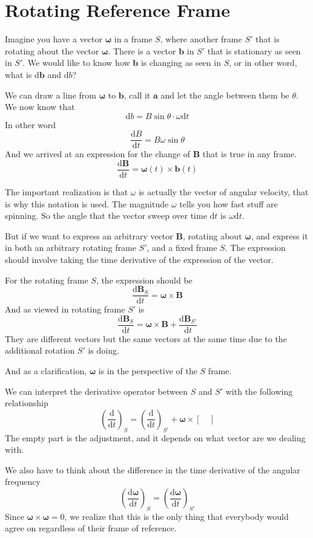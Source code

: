 \documentclass[12pt]{article}
\newcommand{\dydx}[2]{\frac{\text{d} #1}{\text{d} #2}}
\newcommand{\sqbkt}[1]{\left[ #1 \right]}
\newcommand{\paren}[1]{\left( #1 \right)}
\begin{document}
\section{Rotating Reference Frame}

Imagine you have a vector $\boldsymbol\omega$ in a frame $S$, where another frame $S'$ that is rotating about the vector $\boldsymbol{\omega}$. There is a vector $\mathbf{b}$ in $S'$ that is stationary as seen in $S'$. We would like to know how $\mathbf{b}$ is changing as seen in $S$, or in other word, what is $\text{d}\mathbf{b}$ and $\text{d}b$?

We can draw a line from $\boldsymbol\omega$ to $\mathbf{b}$, call it $\mathbf{a}$ and let the angle between them be $\theta$. We now know that
\[
\text{d}b = B\sin\theta\cdot \omega \text{d}t
\]
In other word
\[
\dydx{B}{t} = B\omega\sin\theta
\]
And we arrived at an expression for the change of $\mathbf{B}$ that is true in any frame.
\[
\dydx{\mathbf{B}}{t} = \boldsymbol{\omega}(t)\times \mathbf{b}(t)
\]

The important realization is that $\omega$ is actually the vector of angular velocity, that is why this notation is used. The magnitude $\omega$ tells you how fast stuff are spinning. So the angle that the vector sweep over time $\text{d}t$ is $\omega\text{d}t$.

But if we want to express an arbitrary vector $\mathbf{B}$, rotating about $\boldsymbol{\omega}$, and express it in both an arbitrary rotating frame $S'$, and a fixed frame $S$. The expression should involve taking the time derivative of the expression of the vector.

For the rotating frame $S$, the expression should be
\[
\dydx{\mathbf{B}_{S}}{t} = \boldsymbol{\omega} \times \mathbf{B}
\]
And as viewed in rotating frame $S'$ is
\[
\dydx{\mathbf{B}_S}{t} = \boldsymbol{\omega}\times \mathbf{B} + \dydx{\mathbf{B}_{S'}}{t}
\]
They are different vectors but the same vectors at the same time due to the additional rotation $S'$ is doing. 

And as a clarification, $\boldsymbol{\omega}$ is in the perspective of the $S$ frame. 

We can interpret the derivative operator between $S$ and $S'$ with the following relationship
\[
\paren{\dydx{}{t}}_S = \paren{\dydx{}{t}}_{S'} + \boldsymbol{\omega} \times \sqbkt{\quad}
\]
The empty part is the adjustment, and it depends on what vector are we dealing with.

We also have to think about the difference in the time derivative of the angular frequency
\[
\paren{\dydx{\boldsymbol{\omega}}{t}}_S = \paren{\dydx{\boldsymbol{\omega}}{t}}_{S'}
\]
Since $\boldsymbol{\omega} \times \boldsymbol{\omega} = 0$, we realize that this is the only thing that everybody would agree on regardless of their frame of reference. 
\end{document}
